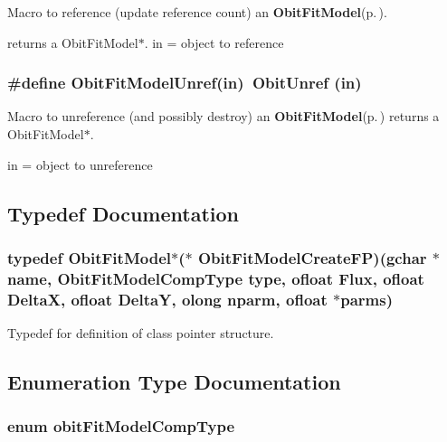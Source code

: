 Macro to reference (update reference count) an {\bf Obit\-Fit\-Model}{\rm (p.\,\pageref{structObitFitModel})}. 

returns a Obit\-Fit\-Model$\ast$. in = object to reference 
\subsubsection{\setlength{\rightskip}{0pt plus 5cm}\#define Obit\-Fit\-Model\-Unref(in)\ Obit\-Unref (in)}\label{ObitFitModel_8h_a0}


Macro to unreference (and possibly destroy) an {\bf Obit\-Fit\-Model}{\rm (p.\,\pageref{structObitFitModel})} returns a Obit\-Fit\-Model$\ast$. 

in = object to unreference 

\subsection{Typedef Documentation}
\subsubsection{\setlength{\rightskip}{0pt plus 5cm}typedef {\bf Obit\-Fit\-Model}$\ast$($\ast$ {\bf Obit\-Fit\-Model\-Create\-FP})(gchar $\ast$name, Obit\-Fit\-Model\-Comp\-Type type, {\bf ofloat} Flux, {\bf ofloat} Delta\-X, {\bf ofloat} Delta\-Y, {\bf olong} nparm, {\bf ofloat} $\ast$parms)}\label{ObitFitModel_8h_a3}


Typedef for definition of class pointer structure. 



\subsection{Enumeration Type Documentation}
\subsubsection{\setlength{\rightskip}{0pt plus 5cm}enum {\bf obit\-Fit\-Model\-Comp\-Type}}\label{ObitFitModel_8h_a17}


